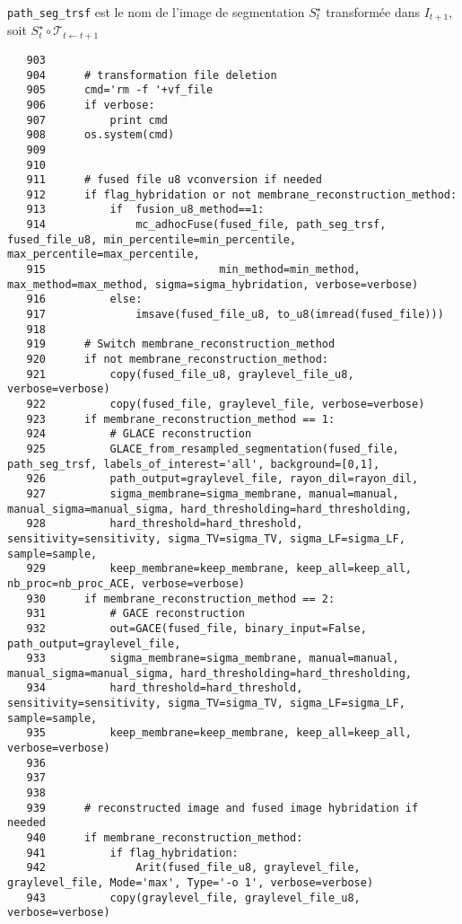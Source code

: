 \documentclass{article}
\def \mycolor {red}
\begin{document}
\color{\mycolor}
\verb|path_seg_trsf| est le nom de l'image de segmentation $S^{\star}_t$ transform\'ee dans $I_{t+1}$, soit
$S^{\star}_t \circ \mathcal{T}_{t \leftarrow t+1}$
\color{black}
\begin{verbatim}  
   903	
   904	    # transformation file deletion
   905	    cmd='rm -f '+vf_file
   906	    if verbose:
   907	        print cmd
   908	    os.system(cmd)
   909	
   910	
   911	    # fused file u8 vconversion if needed
   912	    if flag_hybridation or not membrane_reconstruction_method:
   913	        if  fusion_u8_method==1:
   914	            mc_adhocFuse(fused_file, path_seg_trsf, fused_file_u8, min_percentile=min_percentile, max_percentile=max_percentile, 
   915	                         min_method=min_method, max_method=max_method, sigma=sigma_hybridation, verbose=verbose)
   916	        else:
   917	            imsave(fused_file_u8, to_u8(imread(fused_file)))
   918	
   919	    # Switch membrane_reconstruction_method
   920	    if not membrane_reconstruction_method:
   921	        copy(fused_file_u8, graylevel_file_u8, verbose=verbose)
   922	        copy(fused_file, graylevel_file, verbose=verbose)
   923	    if membrane_reconstruction_method == 1:
   924	        # GLACE reconstruction 
   925	        GLACE_from_resampled_segmentation(fused_file, path_seg_trsf, labels_of_interest='all', background=[0,1], 
   926	        path_output=graylevel_file, rayon_dil=rayon_dil, 
   927	        sigma_membrane=sigma_membrane, manual=manual, manual_sigma=manual_sigma, hard_thresholding=hard_thresholding, 
   928	        hard_threshold=hard_threshold, sensitivity=sensitivity, sigma_TV=sigma_TV, sigma_LF=sigma_LF, sample=sample, 
   929	        keep_membrane=keep_membrane, keep_all=keep_all,  nb_proc=nb_proc_ACE, verbose=verbose)   
   930	    if membrane_reconstruction_method == 2:
   931	        # GACE reconstruction
   932	        out=GACE(fused_file, binary_input=False, path_output=graylevel_file, 
   933	        sigma_membrane=sigma_membrane, manual=manual, manual_sigma=manual_sigma, hard_thresholding=hard_thresholding, 
   934	        hard_threshold=hard_threshold, sensitivity=sensitivity, sigma_TV=sigma_TV, sigma_LF=sigma_LF, sample=sample, 
   935	        keep_membrane=keep_membrane, keep_all=keep_all, verbose=verbose)
   936	
   937	
   938	
   939	    # reconstructed image and fused image hybridation if needed
   940	    if membrane_reconstruction_method:
   941	        if flag_hybridation:
   942	            Arit(fused_file_u8, graylevel_file, graylevel_file, Mode='max', Type='-o 1', verbose=verbose)
   943	        copy(graylevel_file, graylevel_file_u8, verbose=verbose)

\end{verbatim}
\end{document}
